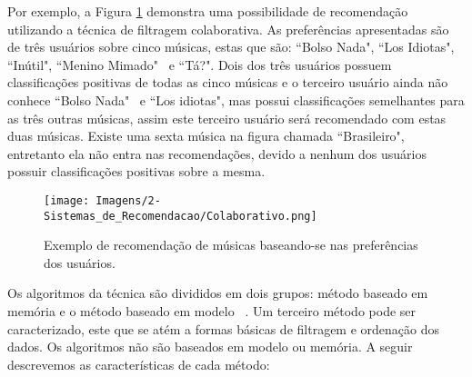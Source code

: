 Por exemplo, a Figura \ref{fig:cf_music} demonstra uma possibilidade de recomendação utilizando a técnica de filtragem colaborativa. As preferências apresentadas são de três usuários sobre cinco músicas, estas que são: ``Bolso Nada", ``Los Idiotas", ``Inútil", ``Menino Mimado"~ e ``Tá?". Dois dos três usuários possuem classificações positivas de todas as cinco músicas e o terceiro usuário ainda não conhece ``Bolso Nada"~ e ``Los idiotas", mas possui classificações semelhantes para as três outras músicas, assim este terceiro usuário será recomendado com estas duas músicas. Existe uma sexta música na figura chamada ``Brasileiro", entretanto ela não entra nas recomendações, devido a nenhum dos usuários possuir classificações positivas sobre a mesma.

\begin{figure}[hbt!]
    \centering
    \texttt{[image: Imagens/2-Sistemas\_de\_Recomendacao/Colaborativo.png]}
    \caption{Exemplo de recomendação de músicas baseando-se nas preferências dos usuários.}
    \label{fig:cf_music}
\end{figure}

Os algoritmos da técnica são divididos em dois grupos: método baseado em memória e o método baseado em modelo~ \cite{Ricci:2011, Isinkaye:2015}. Um terceiro método pode ser caracterizado, este que se atém a formas básicas de filtragem e ordenação dos dados. Os algoritmos não são baseados em modelo ou memória. A seguir descrevemos as características de cada método:

